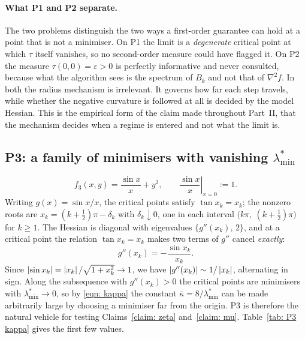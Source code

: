 \documentclass[11pt]{article}
\theoremstyle{plain}
\theoremstyle{definition}
\theoremstyle{remark}
\numberwithin{equation}{section}
\providecommand{\defeq}{\mathrel{:=}}
\begin{document}
\paragraph{What P1 and P2 separate.}
The two problems distinguish the two ways a first-order guarantee can hold at a point that is not
a minimiser. On P1 the limit is a \emph{degenerate} critical point at which $\tau$ itself
vanishes, so no second-order measure could have flagged it. On P2 the measure $\tau(0,0) =
\varepsilon > 0$ is perfectly informative and never consulted, because what the algorithm sees is
the spectrum of $B_k$ and not that of $\nabla^2 f$. In both the radius mechanism is irrelevant. It
governs how far each step travels, while whether the negative curvature is followed at all is
decided by the model Hessian. This is the empirical form of the claim made throughout Part~II,
that the mechanism decides when a regime is entered and not what the limit is.

\subsection{P3: a family of minimisers with vanishing
         \texorpdfstring{$\lambda^*_{\min}$}{lambda-min}}
\label{sec: P3}

\begin{equation}
  f_3(x,y) = \frac{\sin x}{x} + y^2,
  \qquad \left.\frac{\sin x}{x}\right|_{x=0} \defeq 1 .
  \label{eqn: P3}
\end{equation}
Writing $g(x) = \sin x / x$, the critical points satisfy $\tan x_k = x_k$; the nonzero roots are
$x_k = (k+\tfrac12)\pi - \delta_k$ with $\delta_k \downarrow 0$, one in each interval
$\bigl(k\pi,\ (k+\tfrac12)\pi\bigr)$ for $k \geq 1$. The Hessian is diagonal with eigenvalues
$\{g''(x_k),\,2\}$, and at a critical point the relation $\tan x_k = x_k$ makes two terms of
$g''$ cancel \emph{exactly}:
\begin{equation}
  g''(x_k) = -\frac{\sin x_k}{x_k}.
  \label{eqn: gpp at root}
\end{equation}
Since $\left \vert \sin x_k \right \vert = \left \vert x_k \right \vert/\sqrt{1+x_k^2} \to 1$, we have
$\left \vert g''(x_k) \right \vert \sim 1/\left \vert x_k \right \vert$, alternating in sign. Along the subsequence with
$g''(x_k) > 0$ the critical points are minimisers with $\lambda^*_{\min} \to 0$, so by
\eqref{eqn: kappa} the constant $\overline{\kappa} = 8/\lambda^*_{\min}$ can be made arbitrarily
large by choosing a minimiser far from the origin. P3 is therefore the natural vehicle for
testing Claims~\ref{claim: zeta} and~\ref{claim: mu}. Table~\ref{tab: P3 kappa} gives the first
few values.
\end{document}
